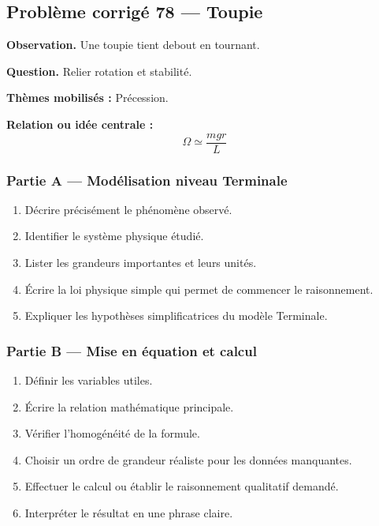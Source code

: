 \documentclass[11pt,a4paper]{article}
\begin{document}
\subsection{Problème corrigé 78 — Toupie}

\begin{exercicebox}
\textbf{Observation.} Une toupie tient debout en tournant.

\medskip
\textbf{Question.} Relier rotation et stabilité.

\medskip
\textbf{Thèmes mobilisés :} Précession.

\medskip
\textbf{Relation ou idée centrale :}
\[
\Omega\simeq\frac{mgr}{L}
\]
\end{exercicebox}

\subsubsection*{Partie A — Modélisation niveau Terminale}

\begin{enumerate}
  \item Décrire précisément le phénomène observé.
  \item Identifier le système physique étudié.
  \item Lister les grandeurs importantes et leurs unités.
  \item Écrire la loi physique simple qui permet de commencer le raisonnement.
  \item Expliquer les hypothèses simplificatrices du modèle Terminale.
\end{enumerate}

\subsubsection*{Partie B — Mise en équation et calcul}

\begin{enumerate}
  \item Définir les variables utiles.
  \item Écrire la relation mathématique principale.
  \item Vérifier l'homogénéité de la formule.
  \item Choisir un ordre de grandeur réaliste pour les données manquantes.
  \item Effectuer le calcul ou établir le raisonnement qualitatif demandé.
  \item Interpréter le résultat en une phrase claire.
\end{enumerate}
\end{document}
